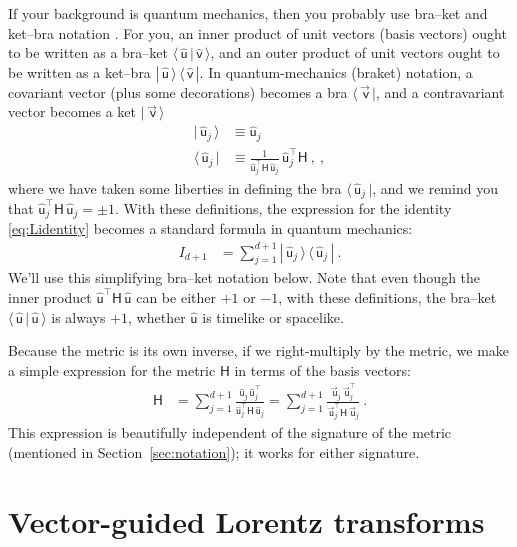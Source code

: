 \documentclass{article}
\newcommand{\metric}{\mathsf{H}}
\newcommand\upvec[1]{\!\vec{\,\mathrm{#1}}}
\newcommand{\Lvec}[1]{\upvec{\mathsf{#1}}} %
\newcommand{\Lhat}[1]{\hat{\mathsf{#1}}} %
\newcommand{\bra}[1]{\langle\,{#1}\,|}
\newcommand{\ket}[1]{|\,{#1}\,\rangle}
\newcommand{\braket}[2]{\langle\,{#1}\,|\,{#2}\,\rangle}
\newcommand{\ketbra}[2]{|\,{#1}\,\rangle\,\langle\,{#2}\,|}
\newcommand{\secref}[1]{Section~\ref{#1}}
\begin{document}
If your background is quantum mechanics, then you probably use bra--ket and ket--bra notation \cite{dirac}.
For you, an inner product of unit vectors (basis vectors) ought to be written as a bra--ket $\braket{\Lhat{u}}{\Lhat{v}}$, and an outer product of unit vectors ought to be written as a ket--bra $\ketbra{\Lhat{u}}{\Lhat{v}}$.
In quantum-mechanics (braket) notation, a covariant vector (plus some decorations) becomes a bra $\bra{\Lvec{v}}$, and a contravariant vector becomes a ket $\ket{\Lvec{v}}$
\begin{align}
    \ket{\Lhat{u}_j} &\equiv \Lhat{u}_j \label{eq:Lket}\\
    \bra{\Lhat{u}_j} &\equiv \frac{1}{\Lhat{u}_j^\top\metric\,\Lhat{u}_j}\,\Lhat{u}_j^\top\metric ~,\label{eq:Lbra} ~,
\end{align}
where we have taken some liberties in defining the bra $\bra{\Lhat{u}_j}$, and we remind you that $\Lhat{u}_j^\top\metric\,\Lhat{u}_j=\pm 1$.
With these definitions, the expression for the identity \eqref{eq:Lidentity} becomes a standard formula in quantum mechanics:
\begin{align}
    I_{d+1} &= \sum_{j=1}^{d+1} \ketbra{\Lhat{u}_j}{\Lhat{u}_j} \label{eq:LidentityQM} ~.
\end{align}
We'll use this simplifying bra--ket notation below.
Note that even though the inner product $\Lhat{u}^\top\metric\,\Lhat{u}$ can be either $+1$ or $-1$, with these definitions, the bra--ket $\braket{\Lhat{u}}{\Lhat{u}}$ is always $+1$, whether $\Lhat{u}$ is timelike or spacelike.

Because the metric is its own inverse, if we right-multiply by the metric, we make a simple expression for the metric $\metric$ in terms of the basis vectors:
\begin{align}
    \metric &= \sum_{j=1}^{d+1} \frac{\Lhat{u}_j\,\Lhat{u}_j^\top}{\Lhat{u}_j^\top\metric\,\Lhat{u}_j} = \sum_{j=1}^{d+1} \frac{\Lvec{u}_j\,\Lvec{u}_j^\top}{\Lvec{u}_j^\top\metric\,\Lvec{u}_j} ~.
\end{align}
This expression is beautifully independent of the signature of the metric (mentioned in \secref{sec:notation}); it works for either signature.

\section{Vector-guided Lorentz transforms}\label{sec:lt}
\end{document}

